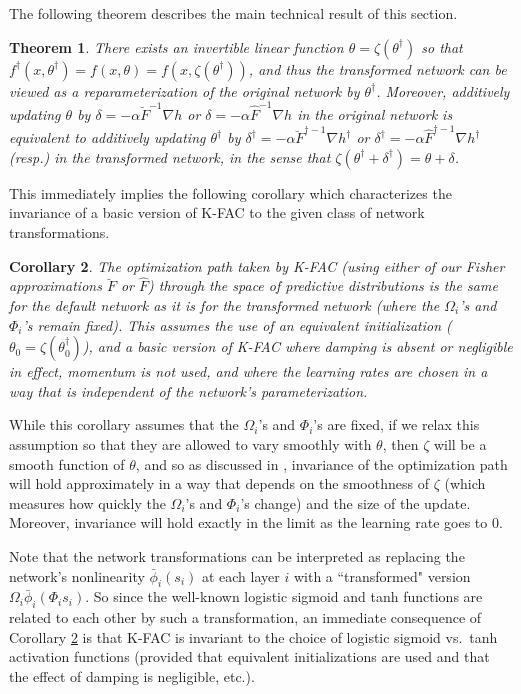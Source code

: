 \documentclass[12pt]{article}
\newcommand{\acronym}{K-FAC}
\newcommand{\nonlin}{\phi}
\newtheorem{theorem}{Theorem}
\newtheorem{corollary}[theorem]{Corollary}
\begin{document}
The following theorem describes the main technical result of this section.

\begin{theorem}
\label{thm:invariance}
There exists an invertible linear function $\theta = \zeta(\theta^\dagger)$ so that $f^\dagger(x,\theta^\dagger) = f(x,\theta) = f(x,\zeta(\theta^\dagger))$, and thus the transformed network can be viewed as a reparameterization of the original network by $\theta^\dagger$.  Moreover, additively updating $\theta$ by $\delta = -\alpha \breve{F}^{-1} \nabla h$ or $\delta = -\alpha \hat{F}^{-1} \nabla h$ in the original network is equivalent to additively updating $\theta^\dagger$ by $\delta^\dagger = -\alpha \breve{F}^{\dagger-1} \nabla h^\dagger$ or $\delta^\dagger = -\alpha \hat{F}^{\dagger-1} \nabla h^\dagger$ (resp.) in the transformed network, in the sense that $\zeta(\theta^\dagger + \delta^\dagger) = \theta + \delta$.
\end{theorem}

This immediately implies the following corollary which characterizes the invariance of a basic version of \acronym{} to the given class of network transformations.

\begin{corollary}
\label{cor:invariance}
The optimization path taken by \acronym{} (using either of our Fisher approximations $\breve{F}$ or $\hat{F}$) through the space of predictive distributions is the same for the default network as it is for the transformed network (where the $\Omega_i$'s and $\Phi_i$'s remain fixed).  This assumes the use of an equivalent initialization ($\theta_0 = \zeta(\theta_0^\dagger)$), and a basic version of \acronym{} where damping is absent or negligible in effect, momentum is not used, and where the learning rates are chosen in a way that is independent of the network's parameterization.
\end{corollary}

While this corollary assumes that the $\Omega_i$'s and $\Phi_i$'s are fixed, if we relax this assumption so that they are allowed to vary smoothly with $\theta$, then $\zeta$ will be a smooth function of $\theta$, and so as discussed in \citet{ng_martens}, invariance of the optimization path will hold approximately in a way that depends on the smoothness of $\zeta$ (which measures how quickly the $\Omega_i$'s and $\Phi_i$'s change) and the size of the update.  Moreover, invariance will hold exactly in the limit as the learning rate goes to 0.

Note that the network transformations can be interpreted as replacing the network's nonlinearity $\bar{\nonlin}_i (s_i)$ at each layer $i$ with a ``transformed" version $\Omega_i \bar{\nonlin}_i( \Phi_i s_i)$.  So since the well-known logistic sigmoid and tanh functions are related to each other by such a transformation, an immediate consequence of Corollary \ref{cor:invariance} is that \acronym{} is invariant to the choice of logistic sigmoid vs.~tanh activation functions (provided that equivalent initializations are used and that the effect of damping is negligible, etc.).  
\end{document}
